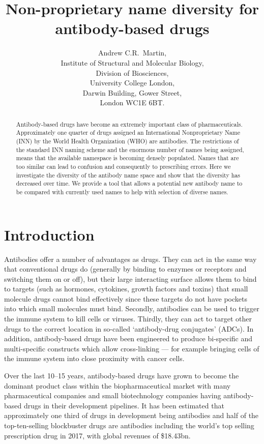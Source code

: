 \documentclass{article}
\title{Non-proprietary name diversity for antibody-based drugs}
\author{Andrew C.R.\ Martin,\\Institute of Structural and Molecular
  Biology,\\Division of Biosciences,\\University College
  London,\\Darwin Building, Gower Street,\\London WC1E 6BT.}
\begin{document}
\maketitle

\begin{abstract}
Antibody-based drugs have become an extremely important class of
pharmaceuticals. Approximately one quarter of drugs assigned an
International Nonproprietary Name (INN) by the World Health
Organization (WHO) are antibodies.  The restrictions of the standard
INN naming scheme and the enormous number of names being assigned,
means that the available namespace is becoming densely populated.
Names that are too similar can lead to confusion and consequently to
prescribing errors. Here we investigate the diversity of the antibody
name space and show that the diversity has decreased over time. We
provide a tool that allows a potential new antibody name to be
compared with currently used names to help with selection of diverse
names.
\end{abstract}

\section{Introduction}
Antibodies offer a number of advantages as drugs. They can act in the
same way that conventional drugs do (generally by binding to enzymes
or receptors and switching them on or off), but their large
interacting surface allows them to bind to targets (such as hormones,
cytokines, growth factors and toxins) that small molecule drugs cannot
bind effectively since these targets do not have pockets into which
small molecules must bind. Secondly, antibodies can be used to trigger
the immune system to kill cells or viruses. Thirdly, they can act to
target other drugs to the correct location in so-called `antibody-drug
conjugates' (ADCs). In addition, antibody-based drugs have been
engineered to produce bi-specific and multi-specific constructs which
allow cross-linking --- for example bringing cells of the immune
system into close proximity with cancer cells.

Over the last 10--15 years, antibody-based drugs have grown to become
the dominant product class within the biopharmaceutical
market\cite{ecker:abmarket} with many pharmaceutical companies and
small biotechnology companies having antibody-based drugs in their
development pipelines. It has been estimated that approximately one
third of drugs in development being antibodies\cite{reichert:trends}
and half of the top-ten-selling blockbuster drugs are
antibodies\cite{igea:top10:2018} including the world's top selling
prescription drug in 2017, with global revenues of \$18.43bn.
\end{document}
